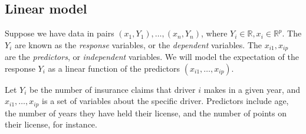 \subsection{Linear model}
Suppose we have data in pairs \( (x_1, Y_1), \dots, (x_n, Y_n) \), where \( Y_i \in \mathbb R, x_i \in \mathbb R^p \).
The \( Y_i \) are known as the \textit{response} variables, or the \textit{dependent} variables.
The \( x_{i1}, x_{ip} \) are the \textit{predictors}, or \textit{independent} variables.
We will model the expectation of the response \( Y_i \) as a linear function of the predictors \( (x_{i1}, \dots, x_{ip}) \).
\begin{example}
	Let \( Y_i \) be the number of insurance claims that driver \( i \) makes in a given year, and \( x_{i1}, \dots, x_{ip} \) is a set of variables about the specific driver.
	Predictors include age, the number of years they have held their license, and the number of points on their license, for instance.
\end{example}
